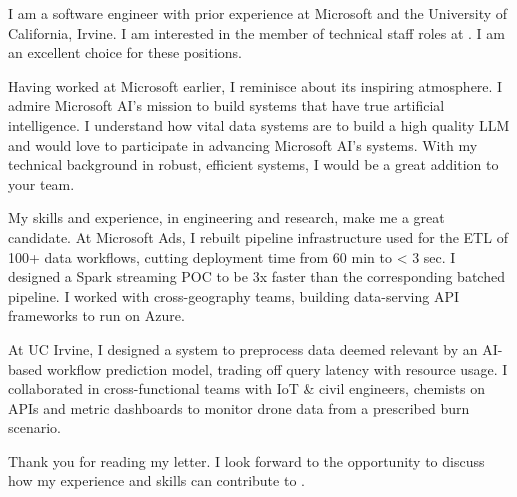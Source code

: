 \raggedright
I am a software engineer with prior experience at Microsoft and the University of California, Irvine. I am interested in the member of technical staff roles at {\company}. I am an excellent choice for these positions. 

Having worked at Microsoft earlier, I reminisce about its inspiring atmosphere. 
I admire Microsoft AI’s mission to build systems that have true artificial
intelligence. I understand how vital data systems are to build
a high quality LLM and would love to participate in advancing Microsoft AI’s systems. With my technical background in robust, efficient systems, I would be a great addition to your team.

My skills and experience, in engineering and research, make me a great candidate. 
At Microsoft Ads, I rebuilt pipeline infrastructure used for the ETL of 100+ data workflows, cutting deployment time from 60 min to < 3 sec. 
I designed a Spark streaming POC to be 3x faster than the corresponding batched pipeline.
I worked with cross-\-geography teams, building data-\-serving API frameworks to run on Azure. 

At UC Irvine, I designed a system to 
preprocess data deemed relevant by an AI- based workflow 
prediction model, trading off query latency with resource usage. 
I collaborated in cross-functional teams with IoT \& civil engineers, chemists on APIs and metric dashboards to monitor drone data from a prescribed burn scenario. 

Thank you for reading my letter. I look forward to the opportunity to discuss how my experience and skills can contribute to {\company}.
